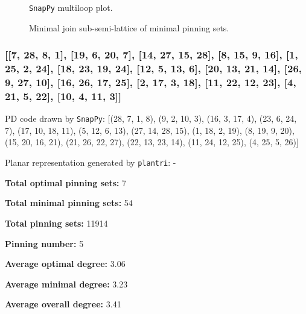 \documentclass{article}%
\begin{document}
\begin{multicols}{2}
\begin{figure}[H]
\centering

\caption{\texttt{SnapPy} multiloop plot.}
\label{fig:tex/img/[[20, 24, 1, 21], [21, 10, 22, 9], [19, 12, 20, 13], [23, 11, 24, 12], [1, 11, 2, 10], [22, 2, 23, 3], [8, 17, 9, 18], [13, 5, 14, 4], [18, 3, 19, 4], [7, 28, 8, 25], [16, 27, 17, 28], [5, 27, 6, 26],.svg}
\end{figure}
\columnbreak

\begin{figure}[H]
\centering
\scalebox{0.8}{}
\caption{Minimal join sub-semi-lattice of minimal pinning sets.}
\label{fig:tex/img/[[20, 24, 1, 21], [21, 10, 22, 9], [19, 12, 20, 13], [23, 11, 24, 12], [1, 11, 2, 10], [22, 2, 23, 3], [8, 17, 9, 18], [13, 5, 14, 4], [18, 3, 19, 4], [7, 28, 8, 25], [16, 27, 17, 28], [5, 27, 6, 26],.pgf}
\end{figure}
\end{multicols}

\newpage

\subsubsection{[[7, 28, 8, 1], [19, 6, 20, 7], [14, 27, 15, 28], [8, 15, 9, 16], [1, 25, 2, 24], [18, 23, 19, 24], [12, 5, 13, 6], [20, 13, 21, 14], [26, 9, 27, 10], [16, 26, 17, 25], [2, 17, 3, 18], [11, 22, 12, 23], [4, 21, 5, 22], [10, 4, 11, 3]]}

{\small\noindent PD code drawn by \texttt{SnapPy}: [(28, 7, 1, 8), (9, 2, 10, 3), (16, 3, 17, 4), (23, 6, 24, 7), (17, 10, 18, 11), (5, 12, 6, 13), (27, 14, 28, 15), (1, 18, 2, 19), (8, 19, 9, 20), (15, 20, 16, 21), (21, 26, 22, 27), (22, 13, 23, 14), (11, 24, 12, 25), (4, 25, 5, 26)]}

{\small\noindent Planar representation generated by \texttt{plantri}: -}

\begin{multicols}{2}
{\normalsize \noindent\textbf{Total optimal pinning sets:} 7

\noindent\textbf{Total minimal pinning sets:} 54

\noindent\textbf{Total pinning sets:} 11914

\noindent\textbf{Pinning number:} 5

}
\columnbreak

{\normalsize \noindent\textbf{Average optimal degree:} 3.06

\noindent\textbf{Average minimal degree:} 3.23

\noindent\textbf{Average overall degree:} 3.41

}
\end{multicols}
\end{document}
